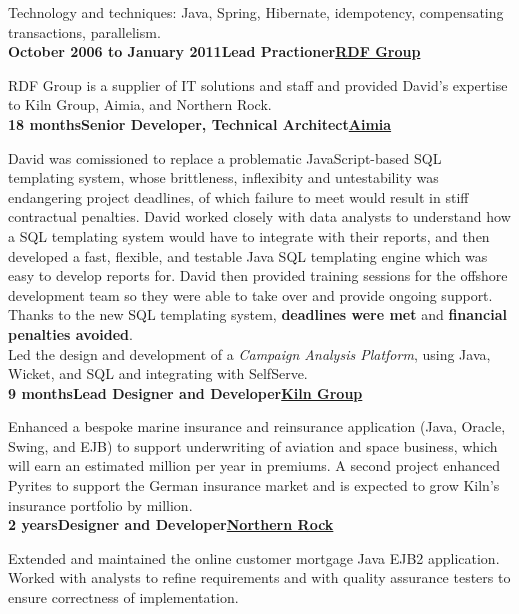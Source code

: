 \documentclass[a4paper,12pt]{article}
\newcommand{\clientwork}[3]{\textbf{#1\hfill#3\hfill#2}\nopagebreak}
\begin{document}
Technology and techniques: Java, Spring, Hibernate, idempotency, compensating transactions, parallelism.\\

\clientwork{October 2006 to January 2011}{\href{http://www.rdfgroup.com/}{RDF Group}}{Lead Practioner}

RDF Group is a supplier of IT solutions and staff and provided David's expertise to Kiln Group, Aimia, and Northern Rock.\\

\clientwork{18 months}{\href{http://www.aimia.com/}{Aimia}}{Senior Developer, Technical Architect}

David was comissioned to replace a problematic JavaScript-based SQL templating system, whose brittleness, inflexibity and untestability was endangering project deadlines, of which failure to meet would result in stiff contractual penalties. David worked closely with data analysts to understand how a SQL templating system would have to integrate with their reports, and then developed a fast, flexible, and testable Java SQL templating engine which was easy to develop reports for. David then provided training sessions for the offshore development team so they were able to take over and provide ongoing support. Thanks to the new SQL templating system, \textbf{deadlines were met} and \textbf{financial penalties avoided}. \\

Led the design and development of a \emph{Campaign Analysis Platform}, using Java, Wicket, and SQL and integrating with SelfServe.\\

\clientwork{9 months}{\href{http://www.tokiomarinekiln.com/}{Kiln Group}}{Lead Designer and Developer}

Enhanced a bespoke marine insurance and reinsurance application (Java, Oracle, Swing, and EJB) to support underwriting of aviation and space business, which will earn an estimated  million per year in premiums. A second project enhanced Pyrites to support the German insurance market and is expected to grow  Kiln's insurance portfolio by  million.\\

\clientwork{2 years}{\href{http://www.northernrock.co.uk}{Northern Rock}}{Designer and Developer}

Extended and maintained the online customer mortgage Java EJB2 application. Worked with analysts to refine requirements and with quality assurance testers to ensure correctness of implementation.\\
\end{document}
